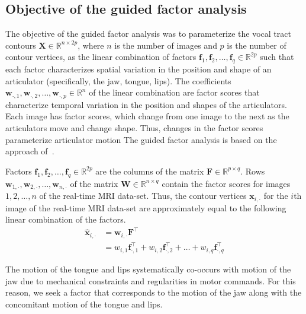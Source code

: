 \documentclass[reprint]{JASAnew}\usepackage[]{graphicx}\usepackage[]{color}
\begin{document}
\subsection{Objective of the guided factor analysis}
\label{subsec:objectivesoftheguidedfactoranalysis}

The objective of the guided factor analysis was to parameterize the vocal tract contours $\mathbf{X} \in \mathbb{R}^{n\times 2p}$, where $n$ is the number of images and $p$ is the number of contour vertices, as the linear combination of factors $\mathbf{f}_1, \mathbf{f}_2, \ldots, \mathbf{f}_q \in \mathbb{R}^{2p}$ such that each factor characterizes spatial variation in the position and shape of an articulator (specifically, the jaw, tongue, lips). 
%
The coefficients $\mathbf{w}_{\cdot,1},\mathbf{w}_{\cdot,2},\ldots,\mathbf{w}_{\cdot,p} \in \mathbb{R}^n$ of the linear combination are factor scores that characterize temporal variation in the position and shapes of the articulators. Each image has factor scores, which change from one image to the next as the articulators move and change shape. Thus, changes in the factor scores parameterize articulator motion
%
The guided factor analysis is based on the approach of~\citet{toutios2015factor}.


Factors $\mathbf{f}_1, \mathbf{f}_2, \ldots, \mathbf{f}_q \in \mathbb{R}^{2p}$ are the columns of the matrix $\mathbf{F} \in \mathbb{R}^{p\times q}$. 
%
Rows $\mathbf{w}_{1,\cdot},\mathbf{w}_{2,\cdot},\ldots,\mathbf{w}_{n,\cdot}$ of the matrix $\mathbf{W} \in \mathbb{R}^{n\times q}$ contain the factor scores for images $1,2,\ldots,n$ of the real-time MRI data-set. 
%
Thus, the contour vertices $\mathbf{x}_{i,\cdot}$ for the $i$th image of the real-time MRI data-set are approximately equal to the following linear combination of the factors. 
%
\begin{align}
\label{eq:linearcombo}
\mathbf{\hat{x}}_{i,\cdot}
 &=
  \mathbf{w}_{i,\cdot} \mathbf{F}^\intercal \\
 &=
  w_{i,1} \mathbf{f}_{\cdot,1}^\intercal
  + w_{i,2} \mathbf{f}_{\cdot,2}^\intercal
  + \ldots
  + w_{i,q} \mathbf{f}_{\cdot,q}^\intercal
\end{align}




The motion of the tongue and lips systematically co-occurs with motion of the jaw due to mechanical constraints and regularities in motor commands. For this reason, we seek a factor that corresponds to the motion of the jaw along with the concomitant motion of the tongue and lips.
\end{document}
